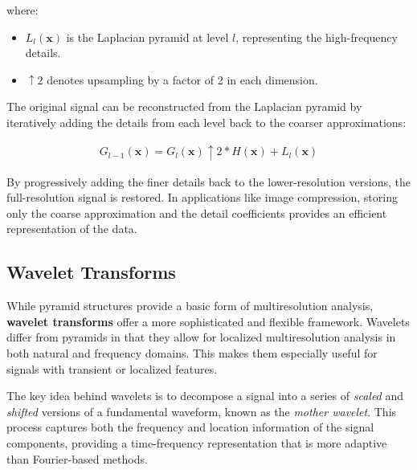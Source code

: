 where:
\begin{itemize}
  \item \(L_l(\mathbf{x})\) is the Laplacian pyramid at level \(l\), representing the high-frequency details.
  \item \(\uparrow 2\) denotes upsampling by a factor of 2 in each dimension.
\end{itemize} 

The original signal can be reconstructed from the Laplacian pyramid by iteratively adding the details from each level back to the coarser approximations:

\begin{align}
  G_{l-1}(\mathbf{x}) = G_l(\mathbf{x}) \uparrow 2 * H(\mathbf{x}) + L_l(\mathbf{x})
\end{align}

By progressively adding the finer details back to the lower-resolution versions, the full-resolution signal is restored. In applications like image compression, storing only the coarse approximation and the detail coefficients provides an efficient representation of the data.

\subsection{Wavelet Transforms}

While pyramid structures provide a basic form of multiresolution analysis, \textbf{wavelet transforms} offer a more sophisticated and flexible framework. Wavelets differ from pyramids in that they allow for localized multiresolution analysis in both natural and frequency domains. This makes them especially useful for signals with transient or localized features.


The key idea behind wavelets is to decompose a signal into a series of \textit{scaled} and \textit{shifted} versions of a fundamental waveform, known as the \textit{mother wavelet}. This process captures both the frequency and location information of the signal components, providing a time-frequency representation that is more adaptive than Fourier-based methods.

